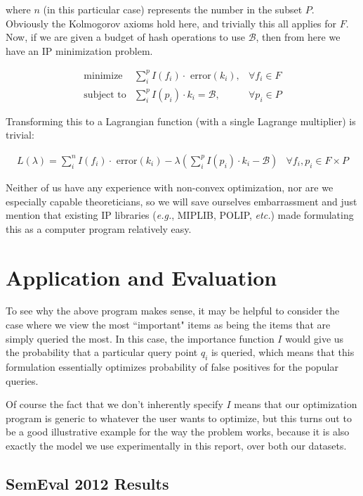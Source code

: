 \documentclass[11pt]{article}
\begin{document}
where $n$ (in this particular case) represents the number in the subset $P$. Obviously the Kolmogorov axioms hold here, and trivially this all applies for $F$. Now, if we are given a budget of hash operations to use $\mathcal{B}$, then from here we have an IP minimization problem.

\begin{eqnarray}
\text{minimize} & \sum_i^p I(f_i) \cdot \text{ error}(k_i), & \forall f_i \in F \\
\text{subject to} & \sum_i^p I(p_i) \cdot k_i = \mathcal{B}, & \forall p_i \in P
\end{eqnarray}

Transforming this to a Lagrangian function (with a single Lagrange multiplier) is trivial:

\begin{eqnarray}
L(\lambda) = \sum_i^n I(f_i) \cdot \text{ error}(k_i) - \lambda(\sum_i^p I(p_i) \cdot k_i - \mathcal{B}) & \forall f_i, p_i \in F \times P
\end{eqnarray}

Neither of us have any experience with non-convex optimization, nor are we especially capable theoreticians, so we will save ourselves embarrassment and just mention that existing IP libraries (\textit{e.g.}, MIPLIB, POLIP, \textit{etc.}) made formulating this as a computer program relatively easy.

\section{Application and Evaluation}

To see why the above program makes sense, it may be helpful to consider the case where we view the most ``important" items as being the items that are simply queried the most. In this case, the importance function $I$ would give us the probability that a particular query point $q_i$ is queried, which means that this formulation essentially optimizes probability of false positives for the popular queries.

Of course the fact that we don't inherently specify $I$ means that our optimization program is generic to whatever the user wants to optimize, but this turns out to be a good illustrative example for the way the problem works, because it is also exactly the model we use experimentally in this report, over both our datasets.



\subsection{SemEval 2012 Results}
\end{document}

